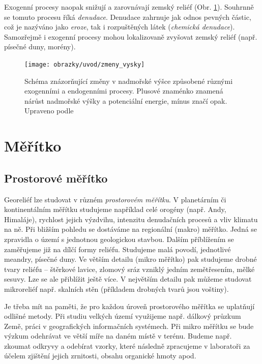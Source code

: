 Exogenní procesy naopak snižují a zarovnávají zemský reliéf (Obr. \ref{fig:zmenyvysky}). Souhrnně se tomuto procesu říká \emph{denudace}. Denudace zahrnuje jak odnos pevných částic, což je nazýváno jako \emph{eroze}, tak i rozpuštěných látek (\emph{chemická denudace}). Samozřejmě i exogenní procesy mohou lokalizovaně zvyšovat zemský reliéf (např. písečné duny, morény).

\begin{figure}[h]
	\centering
	\texttt{[image: obrazky/uvod/zmeny\_vysky]}
	\caption{Schéma znázorňující změny v nadmořské výšce způsobené různými exogenními a endogenními procesy. Plusové znaménko znamená nárůst nadmořské výšky a potenciální energie, mínus značí opak. Upraveno podle \textcite{summerfieldGlobalGeomorphologyIntroduction1999}}
	\label{fig:zmenyvysky}
\end{figure}


\section{Měřítko}
\subsection{Prostorové měřítko}
Georeliéf lze studovat v různém \emph{prostorovém měřítku}. V planetárním či kontinentálním měřítku studujeme například celé orogény (např. Andy, Himaláje), rychlost jejich výzdvihu, intenzitu denudačních procesů a vliv klimatu na ně. Při bližším pohledu se dostáváme na regionální (makro) měřítko. Jedná se zpravidla o území s jednotnou geologickou stavbou. Dalším příblížením se zaměřujeme již na dílčí formy reliéfu. Studujeme malá povodí, jednotlivé meandry, písečné duny. Ve větším detailu (mikro měřítko) pak studujeme drobné tvary reliéfu -- štěrkové lavice, zlomový sráz vzniklý jedním zemětřesením, mělké sesuvy. Lze se ale přiblížit ještě více. V největším detailu pak můžeme studovat mikroreliéf např. skalních stěn (příkladem drobných tvarů jsou voštiny). 

Je třeba mít na paměti, že pro každou úroveň prostorového měřítka se uplatňují odlišné metody. Při studiu velkých území využijeme např. dálkový průzkum Země, práci v geografických informačních systémech. Při mikro měřítku se bude výzkum odehrávat ve větší míře na daném místě v terénu. Budeme např. zkoumat odkryvy a odebírat vzorky, které následně zpracujeme v laboratoři za účelem zjištění jejich zrnitosti, obsahu organické hmoty apod.

